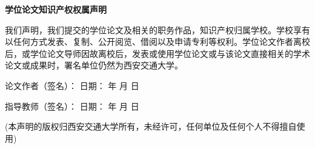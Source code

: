 \documentclass[UTF8, scheme=chinese, openany, oneside]{ctexbook}
\begin{document}
\vspace{1.2cm}
\begin{center}
    { \bfseries 学位论文知识产权权属声明}
\end{center}

\vspace{0.2cm}
\noindent 我们声明，我们提交的学位论文及相关的职务作品，知识产权归属学校。学校享有以任何方式发表、复制、公开阅览、借阅以及申请专利等权利。学位论文作者离校后，或学位论文导师因故离校后，发表或使用学位论文或与该论文直接相关的学术论文或成果时，署名单位仍然为西安交通大学。

\vspace{0.8cm}
\noindent 论文作者（签名）： \underline{\hspace{3.5cm}} \hfill 日期： \quad 年 \quad 月 \quad 日

\vspace{0.4cm}
\noindent 指导教师（签名）： \underline{\hspace{3.5cm}} \hfill 日期： \quad 年 \quad 月 \quad 日

\vspace{1cm}

\begin{center}
    (本声明的版权归西安交通大学所有，未经许可，任何单位及任何个人不得擅自使用)
\end{center}
\end{document}
